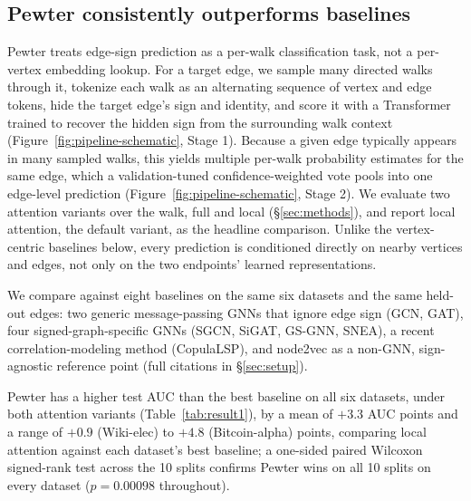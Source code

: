 \documentclass[sigconf]{acmart}
\theoremstyle{plain}
\theoremstyle{definition}
\begin{document}
\subsection{Pewter consistently outperforms baselines}

Pewter treats edge-sign prediction as a per-walk classification task, not a per-vertex embedding lookup. For a target edge, we sample many directed walks through it, tokenize each walk as an alternating sequence of vertex and edge tokens, hide the target edge's sign and identity, and score it with a Transformer trained to recover the hidden sign from the surrounding walk context (Figure~\ref{fig:pipeline-schematic}, Stage 1). Because a given edge typically appears in many sampled walks, this yields multiple per-walk probability estimates for the same edge, which a validation-tuned confidence-weighted vote pools into one edge-level prediction (Figure~\ref{fig:pipeline-schematic}, Stage 2). We evaluate two attention variants over the walk, full and local (\S\ref{sec:methods}), and report local attention, the default variant, as the headline comparison. Unlike the vertex-centric baselines below, every prediction is conditioned directly on nearby vertices and edges, not only on the two endpoints' learned representations.

We compare against eight baselines on the same six datasets and the same held-out edges: two generic message-passing GNNs that ignore edge sign (GCN, GAT), four signed-graph-specific GNNs (SGCN, SiGAT, GS-GNN, SNEA), a recent correlation-modeling method (CopulaLSP), and node2vec as a non-GNN, sign-agnostic reference point (full citations in \S\ref{sec:setup}).

Pewter has a higher test AUC than the best baseline on all six datasets, under both attention variants (Table~\ref{tab:result1}), by a mean of $+3.3$ AUC points and a range of $+0.9$ (Wiki-elec) to $+4.8$ (Bitcoin-alpha) points, comparing local attention against each dataset's best baseline; a one-sided paired Wilcoxon signed-rank test across the 10 splits confirms Pewter wins on all 10 splits on every dataset ($p=0.00098$ throughout).
\end{document}
